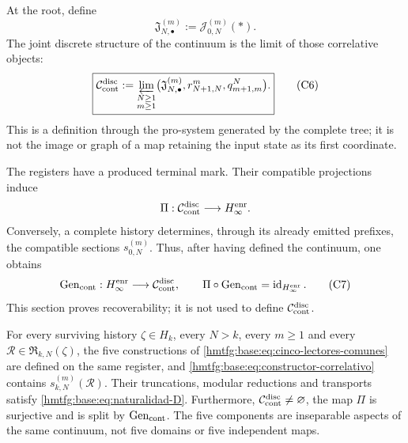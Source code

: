 At the root, define
\[
 \mathfrak J_{N,\bullet}^{(m)}:=\mathcal J_{0,N}^{(m)}(\ast).
\tag{C5}
\label{hmtfg:base:eq:fibras-conjuntas-horizonte}
\]
The joint discrete structure of the continuum is the limit of those
correlative objects:
\[
 \boxed{
 \mathcal C_{\rm cont}^{\rm disc}
 :=\varprojlim_{\substack{N\geq1\\m\geq1}}
   \bigl(\mathfrak J_{N,\bullet}^{(m)},
         r^m_{N+1,N},q^N_{m+1,m}\bigr).}
\tag{C6}
\label{hmtfg:base:eq:continuo-discreto}
\]
This is a definition through the pro-system generated by the complete tree; it is not
the image or graph of a map retaining the input state as
its first coordinate.

The registers have a produced terminal mark. Their compatible projections
induce
\[
 \Pi:\mathcal C_{\rm cont}^{\rm disc}\longrightarrow H_\infty^{\rm enr}.
\]
Conversely, a complete history determines, through its already emitted prefixes,
the compatible sections \(s_{0,N}^{(m)}\). Thus, after having
defined the continuum, one obtains
\[
 \operatorname{Gen}_{\rm cont}:H_\infty^{\rm enr}
 \longrightarrow\mathcal C_{\rm cont}^{\rm disc},
 \qquad
 \Pi\circ\operatorname{Gen}_{\rm cont}
 =\operatorname{id}_{H_\infty^{\rm enr}}.
\tag{C7}
\label{hmtfg:base:eq:seccion-historias-continuo}
\]
This section proves recoverability; it is not used to define
\(\mathcal C_{\rm cont}^{\rm disc}\).

\begin{theorem}
\label{hmtfg:base:thm:correlacion-cinco}
For every surviving history \(\zeta\in H_k\), every \(N>k\), every
\(m\geq1\) and every \(\mathscr R\in\mathfrak R_{k,N}(\zeta)\), the five
constructions of \eqref{hmtfg:base:eq:cinco-lectores-comunes} are defined on the
same register, and \eqref{hmtfg:base:eq:constructor-correlativo} contains
\(s_{k,N}^{(m)}(\mathscr R)\). Their truncations, modular reductions and
transports satisfy \eqref{hmtfg:base:eq:naturalidad-D}. Furthermore,
\(\mathcal C_{\rm cont}^{\rm disc}\neq\varnothing\), the map \(\Pi\)
is surjective and is split by \(\operatorname{Gen}_{\rm cont}\). The
five components are inseparable aspects of the same continuum, not five
domains or five independent maps.
\end{theorem}

